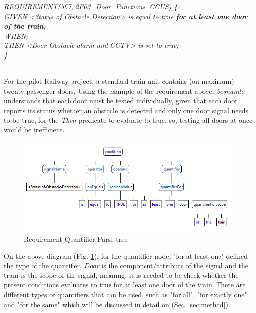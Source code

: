 \textit{
REQUIREMENT(567, 2F03\_Door\_Functions, CCUS) 
\{\\
	GIVEN <Status of Obstacle Detection> is equal to true \textbf{for at least one door of the train};\\
	WHEN;\\
	THEN <Door Obstacle alarm and CCTV> is set to true;\\
\}\\
}\\
\label{eq:requirement_quantifier}

For the pilot Railway project, a standard train unit contains (on maximum) twenty passenger doors. Using the example of the requirement above, \textit{Sesnando} understands that each door must be tested individually, given that each door reports its status whether an obstacle is detected and only one door signal needs to be true, for the \textit{Then} predicate to evaluate to true, so, testing all doors at once would be inefficient.\\

\begin{figure}[H]
    \centering
    \includegraphics[scale=0.85]{images/quantifier_parse_tree.PNG}
    \caption{Requirement Quantifier Parse tree}
    \label{fig:quantifier_parse_tree}
\end{figure}

On the above diagram (Fig. \ref{fig:quantifier_parse_tree}), for the quantifier node, "for at least one" defined the type of the quantifier, \textit{Door} is the component/attribute of the signal and the train is the scope of the signal, meaning, it is needed to be check whether the present conditions evaluates to true for at least one door of the train. There are different types of quantifiers that can be used, such as "for all", "for exactly one" and "for the same" which will be discussed in detail on (Sec. \ref{sec:method}).\\


